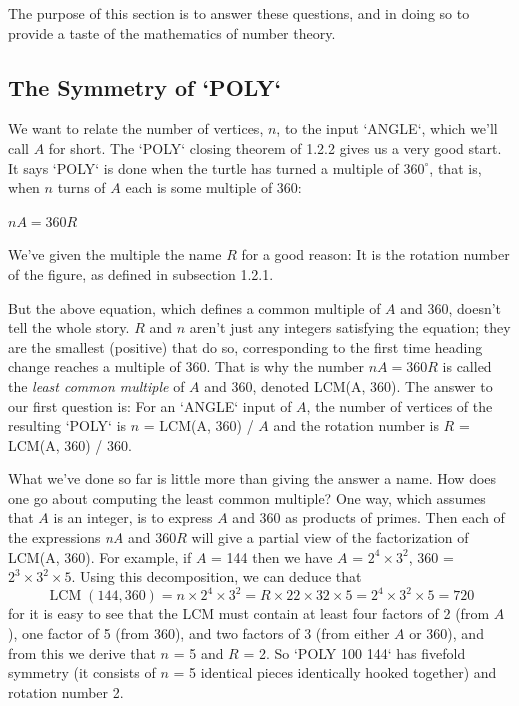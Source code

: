 \documentclass{book}
\begin{document}
The purpose of this section is to answer these questions, and in doing so
to provide a taste of the mathematics of number theory.

\subsection{The Symmetry of \textsc{`POLY`}}

We want to relate the number of vertices, $n$, to the input \textsc{`ANGLE`}, which
we'll call $A$ for short. The \textsc{`POLY`} closing theorem of 1.2.2 gives us a very
good start. It says \textsc{`POLY`} is done when the turtle has turned a multiple
of $360^{\circ}$, that is, when $n$ turns of $A$ each is some multiple of 360:

$nA = 360R$

We've given the multiple the name $R$ for a good reason: It is the rotation
number of the figure, as defined in subsection 1.2.1.

But the above equation, which defines a common multiple of $A$ and
360, doesn't tell the whole story. $R$ and $n$ aren't just any integers
satisfying the equation; they are the smallest (positive) that do so,
corresponding to the first time heading change reaches a multiple of 360.
That is why the number $nA=360R$ is called the {\em least common multiple}
of $A$ and 360, denoted LCM(A, 360). The answer to our first question is:
For an \textsc{`ANGLE`} input of $A$, the number of vertices of the resulting \textsc{`POLY`} is
$n$ = LCM(A, 360) / $A$ and the rotation number is $R$ = LCM(A, 360) / 360.

What we've done so far is little more than giving the answer a name.
How does one go about computing the least common multiple? One way,
which assumes that $A$ is an integer, is to express $A$ and 360 as products
of primes. Then each of the expressions {\em nA} and 360$R$ will give a partial
view of the factorization of LCM(A, 360). For example, if $A$ = 144 then
we have $A$ = $2^4 \times  3^2$, 360 = $2^3 \times 3^2 \times 5$. Using this decomposition, we
can deduce that
$$\operatorname{LCM}(144,360) = n \times 2^4 \times 3^2 = R \times 22 \times 32 \times 5 = 2^4 \times 3^2 \times 5 = 720$$
\noindent for it is easy to see that the LCM must contain at least four factors
of 2 (from $A$), one factor of 5 (from 360), and two factors of 3 (from
either $A$ or 360), and from this we derive that $n$ = 5 and $R$ = 2.
So \textsc{`POLY 100 144`} has fivefold symmetry (it consists of $n$ = 5 identical
pieces identically hooked together) and rotation number 2.
\end{document}
